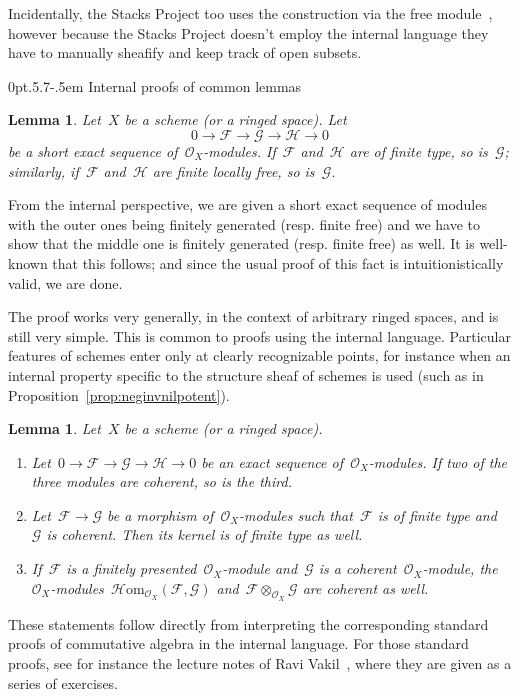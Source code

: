 \documentclass[10pt,reqno,a4paper]{amsbook}
\makeatletter
\theoremstyle{definition}
\theoremstyle{plain}
\newtheorem{lemma}[defn]{Lemma}
\theoremstyle{remark}
\newcommand{\F}{\mathcal{F}}
\renewcommand{\G}{\mathcal{G}}
\renewcommand{\H}{\mathcal{H}}
\renewcommand{\O}{\mathcal{O}}
\newcommand{\HOM}{\mathcal{H}\mathrm{om}}
\newcommand{\?}{\,{:}\,}
\renewcommand{\_}{\mathpunct{.}\,}
\newcommand{\lra}{\longrightarrow}
\newcommand{\resp}{resp.\@\xspace}
\newcommand{\stacksproject}[1]{\cite[{\href{http://stacks.math.columbia.edu/tag/#1}{Tag~#1}}]{stacks-project}}
\renewenvironment{proof}[1][\proofname]{\par
  \pushQED{\qed}%
  \normalfont \topsep6\p@\@plus6\p@\relax
  \trivlist
  \item[\hskip\labelsep
        \itshape
    #1\@addpunct{.}]\ignorespaces
}{%
  \popQED\endtrivlist\@endpefalse
}
\def\subsection{\@startsection{subsection}{2}%
  {0pt}{.5\linespacing\@plus.7\linespacing}{-.5em}%
  {\normalfont\bfseries}}
\makeatother
\begin{document}
Incidentally, the Stacks Project too uses the construction via the free
module~\stacksproject{08RL}, however because the Stacks Project doesn't employ
the internal language they have to manually sheafify and keep track of open
subsets.


\subsection{Internal proofs of common lemmas}

\begin{lemma}Let~$X$ be a scheme (or a ringed space). Let
\[ 0 \lra \F \lra \G \lra \H \lra 0 \]
be a short exact sequence of~$\O_X$-modules. If~$\F$ and~$\H$ are of finite
type, so is~$\G$; similarly, if~$\F$ and~$\H$ are finite locally free, so
is~$\G$.
\end{lemma}
\begin{proof}From the internal perspective, we are given a short exact sequence
of modules with the outer ones being finitely generated (\resp finite free)
and we have to show that the middle one is finitely generated (\resp finite
free) as well. It is well-known that this follows; and since the usual proof of
this fact is intuitionistically valid, we are done.
\end{proof}

The proof works very generally, in the context of arbitrary ringed
spaces, and is still very simple. This is common to proofs using the internal
language. Particular features of schemes enter only at clearly recognizable
points, for instance when an internal property specific to the structure sheaf
of schemes is used (such as in Proposition~\ref{prop:neginvnilpotent}).

\begin{lemma}\label{lemma:coherent-stuff}
Let~$X$ be a scheme (or a ringed space).
\begin{enumerate}
\item Let~$0 \to \F \to \G \to \H \to 0$ be an exact sequence
of~$\O_X$-modules. If two of the three modules are coherent, so is the third.
\item Let~$\F \to \G$ be a morphism of~$\O_X$-modules such that~$\F$ is
of finite type and~$\G$ is coherent. Then its kernel is of finite type as well.
\item If~$\F$ is a finitely presented~$\O_X$-module and~$\G$ is a
coherent~$\O_X$-module, the~$\O_X$-modules~$\HOM_{\O_X}(\F,\G)$ and~$\F \otimes_{\O_X} \G$
are coherent as well.
\end{enumerate}
\end{lemma}
\begin{proof}These statements follow directly from interpreting the
corresponding standard proofs of commutative algebra in the internal language.
For those standard proofs, see for instance the lecture notes of Ravi
Vakil~\cite[Section~13.8]{vakil:foag}, where they are given as a series of
exercises.
\end{proof}
\end{document}
